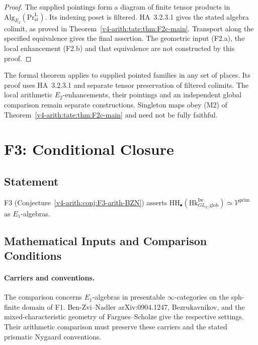 \begin{proof}
The supplied pointings form a diagram of finite tensor products
in \(\mathrm{Alg}_{E_2}(\mathrm{Pr}^{\mathrm L}_{\mathrm{st}})\).
Its indexing poset is filtered. HA~3.2.3.1 gives the stated
algebra colimit, as proved in
Theorem~\ref{v4-arith:tate:thm:F2c-main}.
Transport along the specified equivalence gives the final
assertion. The geometric input (F2.a), the local enhancement
(F2.b) and that equivalence are not constructed by this proof.
\end{proof}

\begin{remark}
\label{v4-arith:cl:rem:F2-open-lemma}
The formal theorem applies to supplied pointed families in any
set of places. Its proof uses HA~3.2.3.1 and separate tensor
preservation of filtered colimits. The local arithmetic
\(E_2\)-enhancements, their pointings and an independent global
comparison remain separate constructions. Singleton maps obey
(M2) of Theorem~\ref{v4-arith:tate:thm:F2c-main} and need not
be fully faithful.
\end{remark}

\section{F3: Conditional Closure}
\label{v4-arith:cl:F3-closure}

\subsection{Statement}

F3 (Conjecture~\ref{v4-arith:conj:F3-arith-BZN}) asserts
\(\mathrm{HH}_{\bullet}(\mathrm{Hk}^{\mathrm{Iw}}_{GL_{2},\mathrm{glob}})\simeq\mathcal{V}^{\mathrm{prim}}\)
as \(E_{1}\)-algebras.

\subsection{Mathematical Inputs and Comparison Conditions}

\paragraph{Carriers and conventions.} The comparison concerns
\(E_1\)-algebras in presentable \(\infty\)-categories on the sph-finite
domain of F1. Ben-Zvi--Nadler arXiv:0904.1247, Bezrukavnikov,
and the mixed-characteristic geometry of Fargues--Scholze give the
respective settings. Their arithmetic comparison must preserve these
carriers and the stated prismatic Nygaard conventions.

